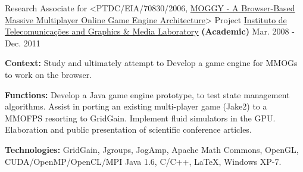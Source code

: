 \begin{cventries}
  \cventry
    {Research Associate for <PTDC/EIA/70830/2006, \href{http://www.di.ubi.pt/~agomes/moggy/index.html}{MOGGY - A Browser-Based Massive Multiplayer Online Game Engine Architecture}> Project} %
    {\href{http://www.it.ubi.pt/medialab}{Instituto de Telecomunica\c{c}\~{o}es and Graphics \& Media Laboratory} \textbf{(Academic)}} %
    {} %
    {Mar. 2008 - Dec. 2011} %
    {
      \begin{cvitems} %
		\item[] {\textbf{Context:} Study and ultimately attempt to Develop a game engine for MMOGs to work on the browser.}
		\item[] {\textbf{Functions:} Develop a Java game engine prototype, to test state management algorithms. Assist in porting an existing multi-player game (Jake2) to a MMOFPS resorting to GridGain. Implement fluid simulators in the GPU. Elaboration and public presentation of scientific conference articles.}
		\item[] {\textbf{Technologies:} %
\textcolor{rainbowcolor-indigo}{GridGain}, \textcolor{rainbowcolor-indigo}{Jgroups}, \textcolor{rainbowcolor-indigo}{JogAmp}, \textcolor{rainbowcolor-indigo}{Apache Math Commons}, \textcolor{rainbowcolor-indigo}{OpenGL}, \textcolor{rainbowcolor-indigo}{CUDA/OpenMP/OpenCL/MPI}
\textcolor{rainbowcolor-indigo}{Java 1.6}, \textcolor{rainbowcolor-indigo}{C/C++}, \textcolor{rainbowcolor-indigo}{LaTeX}, %
\textcolor{rainbowcolor-orange}{Windows XP-7}.}
      \end{cvitems}
    }     
    

\end{cventries}

